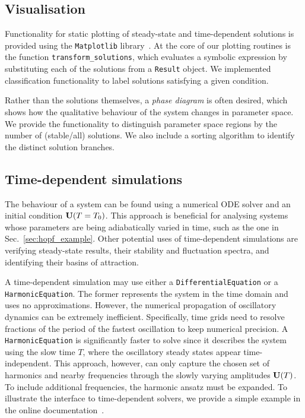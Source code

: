 \subsection{Visualisation}\label{subsec:vis}

Functionality for static plotting of steady-state and time-dependent solutions is provided using the \texttt{Matplotlib} library~\cite{Hunter2007}. At the core of our plotting routines is the function \texttt{transform\_solutions}, which evaluates a symbolic expression by substituting each of the solutions from a \texttt{Result} object. We implemented classification functionality to label solutions satisfying a given condition.

Rather than the solutions themselves, a \textit{phase diagram} is often desired, which shows how the qualitative behaviour of the system changes in parameter space. We provide the functionality to distinguish parameter space regions by the number of (stable/all) solutions. We also include a sorting algorithm to identify the distinct solution branches.

\subsection{Time-dependent simulations}\label{sec:time_dep}

The behaviour of a system can be found using a numerical ODE solver and an initial condition $\vb{U}(T=T_0)$. This approach is beneficial for analysing systems whose parameters are being adiabatically varied in time, such as the one in Sec.~\ref{sec:hopf_example}. Other potential uses of time-dependent simulations are verifying steady-state results, their stability and fluctuation spectra, and identifying their basins of attraction.

A time-dependent simulation may use either a \texttt{DifferentialEquation} or a \texttt{HarmonicEquation}. The former represents the system in the time domain and uses no approximations. However, the numerical propagation of oscillatory dynamics can be extremely inefficient. Specifically, time grids need to resolve fractions of the period of the fastest oscillation to keep numerical precision. A \texttt{HarmonicEquation} is significantly faster to solve since it describes the system using the slow time $T$, where the oscillatory steady states appear time-independent. This approach, however, can only capture the chosen set of harmonics and nearby frequencies through the slowly varying amplitudes $\vb{U}(T)$. To include additional frequencies, the harmonic ansatz must be expanded. To illustrate the interface to time-dependent solvers, we provide a simple example in the online documentation~\cite{harmonic_balance_docs}.

